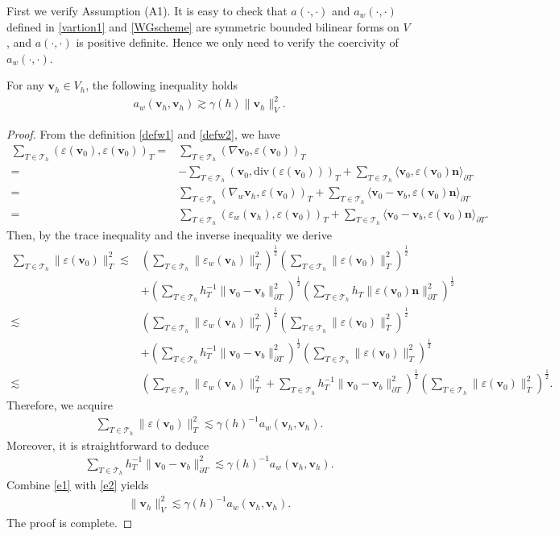 \documentclass[leqno,CJK]{siamltex704}
\numberwithin{equation}{section}
\def\sumT{\sum_{T\in\mathcal{T}_h}}     %
\def\bv{{\mathbf{v}}}
\def\bn{{\mathbf{n}}}
\newcommand{\eps}{\varepsilon}
\newcommand{\di}{\text{div}}
\newcommand{\la}{\langle}
\newcommand{\ra}{\rangle_{\partial T}}
\begin{document}
First we verify Assumption (A1). It is easy to check that $a(\cdot,\cdot)$ and $a_w(\cdot,\cdot)$ defined in \eqref{vartion1} and \eqref{WGscheme} are symmetric bounded bilinear forms on $V$, and $a(\cdot,\cdot)$ is positive definite. Hence we only need to verify the coercivity of $a_w(\cdot,\cdot)$.
\begin{lemma}\label{coe}
	For any $\bv_h\in V_h$, the following inequality holds
	\begin{eqnarray*}
		a_w(\bv_h,\bv_h)\gtrsim\gamma(h)\|\bv_h\|_V^2.
	\end{eqnarray*}
\end{lemma}
\begin{proof}
	From the definition \eqref{defw1} and \eqref{defw2}, we have
	\begin{align*}
		\sumT(\eps(\bv_0),\eps(\bv_0))_T=&\sumT(\nabla \bv_0,\eps(\bv_0))_T
		\\
		=& -\sumT(\bv_0,\di(\eps(\bv_0)))_T + \sumT\la\bv_0,\eps(\bv_0)\bn\ra
		\\
		=& \sumT(\nabla_w \bv_h,\eps(\bv_0))_T + \sumT\la \bv_0-\bv_b,\eps(\bv_0)\bn\ra
		\\
		=& \sumT(\eps_w(\bv_h),\eps(\bv_0))_T + \sumT\la \bv_0-\bv_b,\eps(\bv_0)\bn\ra.
	\end{align*}
	Then, by the trace inequality and the inverse inequality we derive
	\begin{align*}
		\sumT\|\eps(\bv_0)\|_T^2
		\lesssim & \left(\sumT\|\eps_w(\bv_h)\|_T^2\right)^\frac12\left(\sumT\|\eps(\bv_0)\|_T^2\right)^\frac12
		\\
		\quad&+\left(\sumT h_T^{-1}\|\bv_0-\bv_b\|_{\partial T}^2\right)^\frac12\left(\sumT h_T\|\eps(\bv_0)\bn\|_{\partial T}^2\right)^\frac12
		\\
		\lesssim & \left(\sumT\|\eps_w(\bv_h)\|_T^2\right)^\frac12\left(\sumT\|\eps(\bv_0)\|_T^2\right)^\frac12
		\\
		\quad&+\left(\sumT h_T^{-1}\|\bv_0-\bv_b\|_{\partial T}^2\right)^\frac12\left(\sumT \|\eps(\bv_0)\|_T^2\right)^\frac12
		\\
		\lesssim & \left(\sumT\|\eps_w(\bv_h)\|_T^2+\sumT h_T^{-1}\|\bv_0-\bv_b\|_{\partial T}^2\right)^\frac12\left(\sumT \|\eps(\bv_0)\|_T^2\right)^\frac12.
	\end{align*}
	Therefore, we acquire
	\begin{eqnarray}\label{e1}
		\sumT\|\eps(\bv_0)\|_T^2
		\lesssim \gamma(h)^{-1}a_w(\bv_h,\bv_h).
	\end{eqnarray}
	Moreover, it is straightforward to deduce
	 \begin{eqnarray}\label{e2}
	 	\sumT h_T^{-1}\|\bv_0-\bv_b\|_{\partial T}^2\lesssim \gamma(h)^{-1}a_w(\bv_h,\bv_h).
	 \end{eqnarray} 
	Combine \eqref{e1} with \eqref{e2} yields
	\begin{eqnarray*}
		\|\bv_h\|_V^2\lesssim \gamma(h)^{-1}a_w(\bv_h,\bv_h).
	\end{eqnarray*}
	The proof is complete.
\end{proof}
\end{document}
